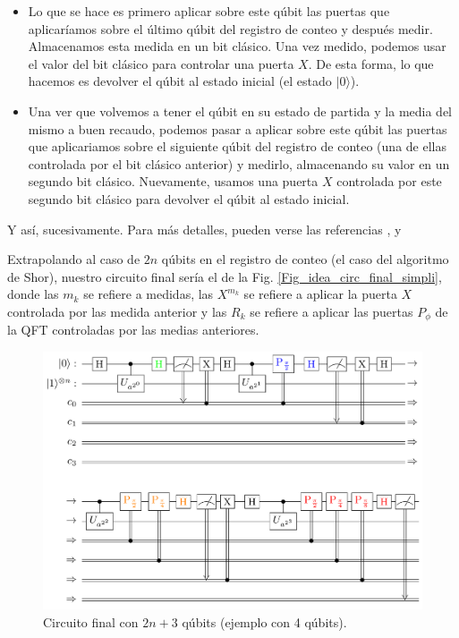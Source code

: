 \documentclass[a4paper,11pt]{book} %
\numberwithin{equation}{chapter}
\begin{document}
\begin{itemize}
	\item Lo que se hace es primero aplicar sobre este qúbit las puertas que aplicaríamos sobre el último qúbit del registro de conteo y después medir. Almacenamos esta medida en un bit clásico. Una vez medido, podemos usar el valor del bit clásico para controlar una puerta $X$. De esta forma, lo que hacemos es devolver el qúbit al estado inicial (el estado $| 0 \rangle$).
	\item  Una ver que volvemos a tener el qúbit en su estado de partida y la media del mismo a buen recaudo, podemos pasar a aplicar sobre este qúbit las puertas que aplicariamos sobre el siguiente qúbit del registro de conteo (una de ellas controlada por el bit clásico anterior) y medirlo, almacenando su valor en un segundo bit clásico. Nuevamente, usamos una puerta $X$ controlada por este segundo bit clásico para devolver el qúbit al estado inicial. 
\end{itemize}
Y así, sucesivamente. Para más detalles, pueden verse las referencias \cite{bib_https://doi.org/10.48550/arxiv.quant-ph/9903071}, \cite{bib_https://doi.org/10.48550/arxiv.quant-ph/9806084} y \cite{bib_PhysRevLett.85.3049}

Extrapolando al caso de $2n$ qúbits en el registro de conteo (el caso del algoritmo de Shor), nuestro circuito final sería el de la Fig. \ref{Fig_idea_circ_final_simpli}, donde las $m_k$ se refiere a medidas, las $X^{m_k}$ se refiere a aplicar la puerta $X$ controlada por las medida anterior y las $R_k$ se refiere a aplicar las puertas $P_\phi$ de la QFT controladas por las medias anteriores. 



\begin{figure}[t]
\centering
\includegraphics[width=0.8\linewidth]{Figuras/Fig_IPE_4.png}
\caption{Circuito final con $2n+3$ qúbits (ejemplo con 4 qúbits). }
\label{Fig_IPE_4}
\end{figure}
\end{document}
